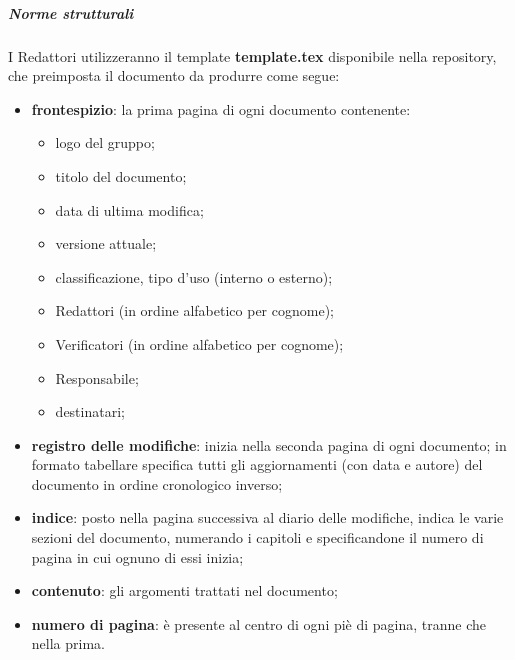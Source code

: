 		\subparagraph{Norme strutturali}
		I Redattori utilizzeranno il template \textbf{template.tex} disponibile nella repository, che preimposta il documento da produrre come segue:
		\begin{itemize}
			\item \textbf{frontespizio}: la prima pagina di ogni documento contenente:
			\begin{itemize}
				\item logo del gruppo;
				\item titolo del documento;
				\item data di ultima modifica;
				\item versione attuale;
				\item classificazione, tipo d'uso (interno o esterno);
				\item Redattori (in ordine alfabetico per cognome);
				\item Verificatori (in ordine alfabetico per cognome);
				\item Responsabile;
				\item destinatari;
			\end{itemize}
			\item \textbf{registro delle modifiche}: inizia nella seconda pagina di ogni documento; in formato tabellare specifica tutti gli aggiornamenti (con data e autore) del documento in ordine cronologico inverso;
			\item \textbf{indice}: posto nella pagina successiva al diario delle modifiche, indica le varie sezioni del documento, numerando i capitoli e specificandone il numero di pagina in cui ognuno di essi inizia;
			\item \textbf{contenuto}: gli argomenti trattati nel documento;
			\item \textbf{numero di pagina}: è presente al centro di ogni piè di pagina, tranne che nella prima.
		\end{itemize}

